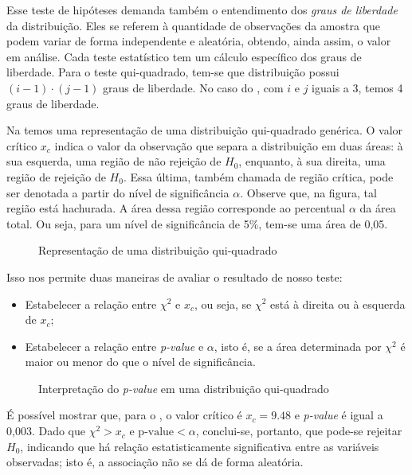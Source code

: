 \begin{sol}
Esse teste de hipóteses demanda também o entendimento dos \emph{graus de
liberdade} da distribuição. Eles se referem à quantidade de observações da
amostra que podem variar de forma independente e aleatória, obtendo, ainda
assim, o valor em análise. Cada teste estatístico tem um cálculo específico dos
graus de liberdade. Para o teste qui-quadrado, tem-se que distribuição possui
$(i-1) \cdot (j-1)$ graus de liberdade. No caso do ,
com $i$ e $j$ iguais a 3, temos 4 graus de liberdade.

Na  temos uma representação de uma distribuição
qui-quadrado genérica. O valor crítico $x_c$ indica o valor da observação que
separa a distribuição em duas áreas: à sua esquerda, uma região de não rejeição
de $H_0$, enquanto, à sua direita, uma região de rejeição de $H_0$. Essa
última, também chamada de região crítica, pode ser denotada a partir do nível
de significância $\alpha$. Observe que, na figura, tal região está hachurada. A
área dessa região corresponde ao percentual $\alpha$ da área total. Ou seja,
para um nível de significância de 5\%, tem-se uma área de 0,05.

\begin{figure}[htpb]
    \centering
    
    \caption{Representação de uma distribuição qui-quadrado}
    \label{fig:dist-qui-quadrado}
\end{figure}

Isso nos permite duas maneiras de avaliar o resultado de nosso teste:
\begin{itemize}
    \item Estabelecer a relação entre $\chi^2$ e $x_c$, ou seja, se $\chi^2$
    está à direita ou à esquerda de $x_c$;
    \item Estabelecer a relação entre \emph{p-value} e $\alpha$, isto é, se a
    área determinada por $\chi^2$ é maior ou menor do que o nível de
    significância.
\end{itemize}

\begin{figure}[htpb]
    \centering
    
    \caption{Interpretação do \emph{p-value} em uma distribuição qui-quadrado}
    \label{fig:dist-qui-quadrado-pvalor}
\end{figure}

É possível mostrar
que, para o , o valor crítico é $x_c=9.48$ e
\emph{p-value} é igual a 0,003. Dado que $\chi^2 > x_c$ e $\textrm{p-value} <
\alpha$, conclui-se, portanto, que pode-se rejeitar $H_0$, indicando que há
relação estatisticamente significativa entre as variáveis observadas; isto é, a
associação não se dá de forma aleatória.
\end{sol}

